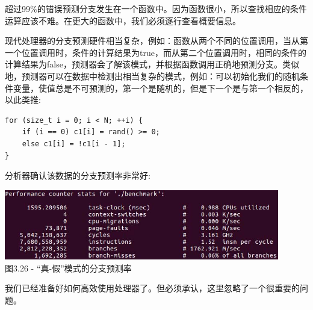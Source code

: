 超过99\%的错误预测分支发生在一个函数中。因为函数很小，所以查找相应的条件运算应该不难。在更大的函数中，我们必须逐行查看概要信息。

现代处理器的分支预测硬件相当复杂，例如：函数从两个不同的位置调用，当从第一个位置调用时，条件的计算结果为true，而从第二个位置调用时，相同的条件的计算结果为false，预测器会了解该模式，并根据函数调用正确地预测分支。类似地，预测器可以在数据中检测出相当复杂的模式，例如：可以初始化我们的随机条件变量，使值总是不可预测的，第一个是随机的，但是下一个是与第一个相反的，以此类推:

\begin{lstlisting}[style=styleCXX]
for (size_t i = 0; i < N; ++i) {
	if (i == 0) c1[i] = rand() >= 0;
	else c1[i] = !c1[i - 1];
}
\end{lstlisting}

分析器确认该数据的分支预测率非常好:

\begin{center}
\includegraphics[width=0.9\textwidth]{content/1/chapter3/images/26.jpg}\\
图3.26 - “真-假”模式的分支预测率
\end{center}

我们已经准备好如何高效使用处理器了。但必须承认，这里忽略了一个很重要的问题。































